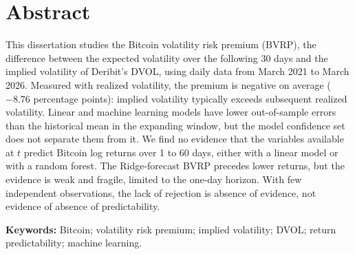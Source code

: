 \chapter*{Abstract}

This dissertation studies the Bitcoin volatility risk premium (BVRP), the
difference between the expected volatility over the following 30 days and
the implied volatility of Deribit's DVOL, using daily data from March
2021 to March 2026. Measured with realized volatility, the premium is negative
on average ($-8.76$ percentage points): implied volatility typically exceeds
subsequent realized volatility.
Linear and machine learning models have lower out-of-sample errors than the
historical mean in the expanding window, but the model confidence set does not
separate them from it. We find no evidence that the variables available at $t$
predict Bitcoin log returns over 1 to 60 days, either with a linear model or with a random forest. The Ridge-forecast
BVRP precedes lower returns, but the evidence is weak and fragile, limited to
the one-day horizon. With few independent observations, the lack of rejection
is absence of evidence, not evidence of absence of predictability.

\vspace{0.5cm}
\noindent\textbf{Keywords:} Bitcoin; volatility risk premium; implied volatility; DVOL; return predictability; machine learning.
